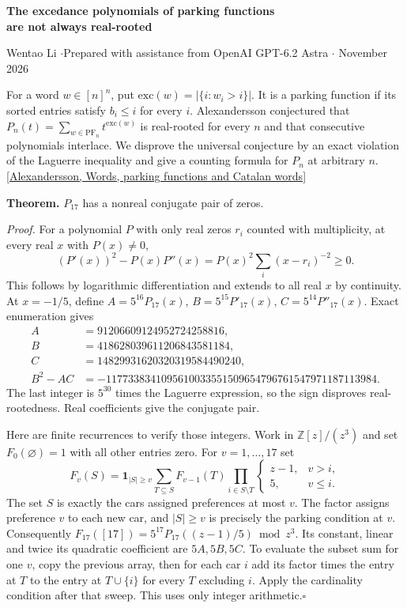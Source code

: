 \documentclass[11pt]{article}
\newcommand{\done}{\hfill\(\square\)}
\begin{document}
\begin{center}{\Large\bfseries The excedance polynomials of parking functions\\ are not always real-rooted}\par
\small Wentao Li \enspace$\cdot$\enspace Prepared with assistance from OpenAI GPT-6.2 Astra \enspace$\cdot$ November 2026\end{center}

For a word $w\in[n]^n$, put $\mathrm{exc}(w)=|\{i:w_i>i\}|$. It is a parking function if its sorted entries satisfy $b_i\le i$ for every $i$. Alexandersson conjectured that $P_n(t)=\sum_{w\in\mathrm{PF}_n}t^{\mathrm{exc}(w)}$ is real-rooted for every $n$ and that consecutive polynomials interlace. We disprove the universal conjecture by an exact violation of the Laguerre inequality and give a counting formula for $P_n$ at arbitrary $n$. [\href{https://www.symmetricfunctions.com/realRootedOpenProblems.htm}{Alexandersson, Words, parking functions and Catalan words}]

\textbf{Theorem.} $P_{17}$ has a nonreal conjugate pair of zeros.

\textit{Proof.} For a polynomial $P$ with only real zeros $r_i$ counted with multiplicity, at every real $x$ with $P(x)\ne0$,
\[
    (P'(x))^2-P(x)P''(x)=P(x)^2\sum_i(x-r_i)^{-2}\ge0 .
\]
This follows by logarithmic differentiation and extends to all real $x$ by continuity. At $x=-1/5$, define $A=5^{16}P_{17}(x)$, $B=5^{15}P'_{17}(x)$, $C=5^{14}P''_{17}(x)$. Exact enumeration gives
\[
\begin{aligned}
 A&=91206609124952724258816,\\
 B&=418628039611206843581184,\\
 C&=14829931620320319584490240,\\
 B^2-AC&=-1177338341095610033551509654796761547971187113984 .
\end{aligned}
\]
The last integer is $5^{30}$ times the Laguerre expression, so the sign disproves real-rootedness. Real coefficients give the conjugate pair.

Here are finite recurrences to verify those integers. Work in $\mathbb{Z}[z]/(z^3)$ and set $F_0(\varnothing)=1$ with all other entries zero. For $v=1,\ldots,17$ set
\[
 F_v(S)=\mathbf1_{|S|\ge v}
       \sum_{T\subseteq S} F_{v-1}(T)
       \prod_{i\in S\setminus T}
         \begin{cases}z-1,&v>i,\\5,&v\le i.\end{cases}
 \tag{1}
\]
The set $S$ is exactly the cars assigned preferences at most $v$. The factor assigns preference $v$ to each new car, and $|S|\ge v$ is precisely the parking condition at $v$. Consequently $F_{17}([17])=5^{17}P_{17}((z-1)/5)\bmod z^3$. Its constant, linear and twice its quadratic coefficient are $5A,5B,5C$. To evaluate the subset sum for one $v$, copy the previous array, then for each car $i$ add its factor times the entry at $T$ to the entry at $T\cup\{i\}$ for every $T$ excluding $i$. Apply the cardinality condition after that sweep. This uses only integer arithmetic.\done
\end{document}
